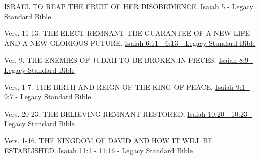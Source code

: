 \documentclass[
  ignorenonframetext,
]{beamer}
\begin{document}
\begin{frame}{5}
\label{section-36}
\begin{block}{ISRAEL TO REAP THE FRUIT OF HER DISOBEDIENCE.}
\label{israel-to-reap-the-fruit-of-her-disobedience.}
\href{https://read.lsbible.org/?q=is5}{Isaiah 5 - Legacy Standard Bible}
\end{block}
\end{frame}

\begin{frame}{6}
\label{section-37}
\begin{block}{Vers. 11-13. THE ELECT REMNANT THE GUARANTEE OF A NEW LIFE
AND A NEW GLORIOUS FUTURE.}
\label{vers.-11-13.-the-elect-remnant-the-guarantee-of-a-new-life-and-a-new-glorious-future.}
\href{https://read.lsbible.org/?q=is6\%3A11-13}{Isaiah 6:11 - 6:13 -
Legacy Standard Bible}
\end{block}
\end{frame}

\begin{frame}{8}
\label{section-38}
\begin{block}{Ver. 9. THE ENEMIES OF JUDAH TO BE BROKEN IN PIECES.}
\label{ver.-9.-the-enemies-of-judah-to-be-broken-in-pieces.}
\href{https://read.lsbible.org/?q=is8\%3A9}{Isaiah 8:9 - Legacy Standard
Bible}
\end{block}
\end{frame}

\begin{frame}{9}
\label{section-39}
\begin{block}{Vers. 1-7. THE BIRTH AND REIGN OF THE KING OF PEACE.}
\label{vers.-1-7.-the-birth-and-reign-of-the-king-of-peace.}
\href{https://read.lsbible.org/?q=is9\%3A1-7}{Isaiah 9:1 - 9:7 - Legacy
Standard Bible}
\end{block}
\end{frame}

\begin{frame}{10}
\label{section-40}
\begin{block}{Vers. 20-23. THE BELIEVING REMNANT RESTORED.}
\label{vers.-20-23.-the-believing-remnant-restored.}
\href{https://read.lsbible.org/?q=is10\%3A20-23}{Isaiah 10:20 - 10:23 -
Legacy Standard Bible}
\end{block}
\end{frame}

\begin{frame}{11}
\label{section-41}
\begin{block}{Vers. 1-16. THE KINGDOM OF DAVID AND HOW IT WILL BE
ESTABLISHED.}
\label{vers.-1-16.-the-kingdom-of-david-and-how-it-will-be-established.}
\href{https://read.lsbible.org/?q=is11\%3A1-16}{Isaiah 11:1 - 11:16 -
Legacy Standard Bible}
\end{block}
\end{frame}
\end{document}
